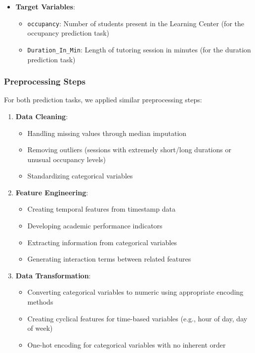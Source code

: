 \documentclass[12pt,letterpaper]{article}
\begin{document}
\begin{itemize}
    \item \textbf{Target Variables}:
    \begin{itemize}
        \item \texttt{occupancy}: Number of students present in the Learning Center (for the occupancy prediction task)
        \item \texttt{Duration\_In\_Min}: Length of tutoring session in minutes (for the duration prediction task)
    \end{itemize}
\end{itemize}

\subsubsection{Preprocessing Steps}

For both prediction tasks, we applied similar preprocessing steps:

\begin{enumerate}
    \item \textbf{Data Cleaning}:
    \begin{itemize}
        \item Handling missing values through median imputation
        \item Removing outliers (sessions with extremely short/long durations or unusual occupancy levels)
        \item Standardizing categorical variables
    \end{itemize}

    \item \textbf{Feature Engineering}:
    \begin{itemize}
        \item Creating temporal features from timestamp data
        \item Developing academic performance indicators
        \item Extracting information from categorical variables
        \item Generating interaction terms between related features
    \end{itemize}

    \item \textbf{Data Transformation}:
    \begin{itemize}
        \item Converting categorical variables to numeric using appropriate encoding methods
        \item Creating cyclical features for time-based variables (e.g., hour of day, day of week)
        \item One-hot encoding for categorical variables with no inherent order
    \end{itemize}
\end{enumerate}
\end{document}
